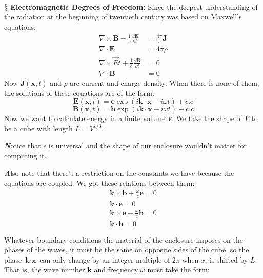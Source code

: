 \documentclass[9pt,a4paper, twocolumn]{article}
\newenvironment{callout}
	{\begin{calloutbox}\color{charcoal}\textbf\textit}
	{\end{calloutbox}}
\newcommand{\newpoint}[1]{\ \\ \indent$\mathsection$ \textbf{#1}}
\newcommand{\curl}{\nabla\times}
\newcommand{\diver}{\nabla\cdot}
\newcommand{\vect}[1]{\textbf{#1}}
\begin{document}
            \\
            \\
            \newpoint{Electromagnetic Degrees of Freedom:} Since the deepest understanding of the radiation at the beginning of twentieth century was based on Maxwell's equations:
            \begin{align}
                \curl \vect B - \frac1c \frac{\partial \vect E}{\partial t} &= \frac{4\pi}{c}\vect J \\
                \diver \vect E &= 4\pi\rho\\
                \curl \vec Et + \frac1c\frac{\partial \vect B}{\partial t} &= 0 \\
                \diver \vect B &= 0
            \end{align}
            Now $\vect J(\vect x, t)$ and $\rho$ are current and charge density. When there is none of them, the solutions of these equations are of the form:
            \begin{equation}
                \vect E(\vect x, t) = \vect e \exp(i\vect k \cdot \vect x - i\omega t) + c.c
            \end{equation}
            \begin{equation}
                \vect B(\vect x, t) = \vect b \exp(i\vect k \cdot \vect x - i\omega t) + c.c
            \end{equation}
            Now we want to calculate energy in a finite volume $V$. We take the shape of $V$ to be a cube with length $L = V^{1/3}$.
            \begin{callout}
                Notice that $\epsilon$ is universal and the shape of our enclosure wouldn't matter for computing it.
            \end{callout}
            \begin{callout}
                Also note that there's a restriction on the constants we have because the equations are coupled. We got these relations between them:
                \begin{align*}
                    \vect k\times\vect b + \frac\omega c \vect e = 0\\
                    \vect k\cdot\vect e = 0\\
                    \vect k\times\vect e - \frac\omega c \vect b = 0 \\
                    \vect k \cdot \vect b = 0
                \end{align*}
            \end{callout}
            Whatever boundary conditions the material of the enclosure imposes on the phases of the waves, it must be the same on opposite sides of the cube, so the phase $\vect k \cdot \vect x$ can only change by an integer multiple of $2\pi$ when $x_i$ is shifted by $L$. That is, the wave number $\vect k$ and frequency $\omega$ must take the form:
\end{document}
